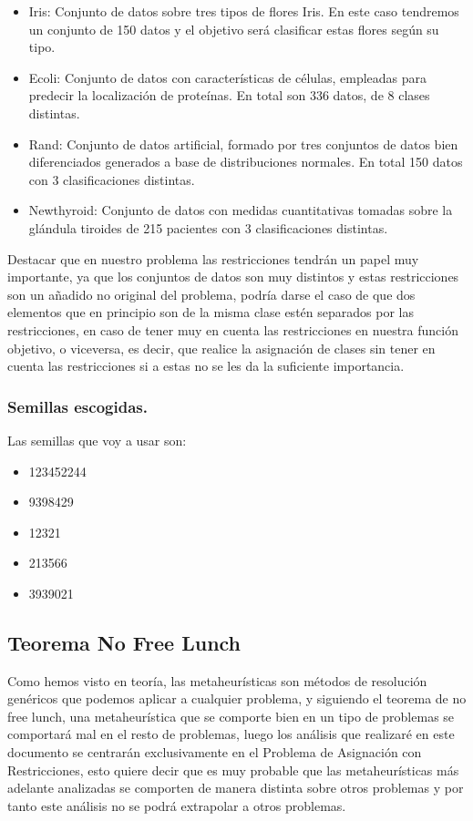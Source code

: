 \documentclass[12pt, spanish]{article}
\begin{document}
\begin{itemize}
	\item{Iris: Conjunto de datos sobre tres tipos de flores Iris. En este caso tendremos un conjunto de 150 datos y el objetivo será clasificar estas flores según su tipo.}
	\item{Ecoli: Conjunto de datos con características de células, empleadas para predecir la localización de proteínas. En total son 336 datos, de 8 clases distintas.}
	\item{Rand: Conjunto de datos artificial, formado por tres conjuntos de datos bien diferenciados generados a base de distribuciones normales. En total 150 datos con 3 clasificaciones distintas.}
	\item{Newthyroid: Conjunto de datos con medidas cuantitativas tomadas sobre la glándula tiroides de 215 pacientes con 3 clasificaciones distintas.} 
\end{itemize}

Destacar que en nuestro problema las restricciones tendrán un papel muy importante, ya que los conjuntos de datos son muy distintos y estas restricciones son un añadido no original del problema, podría darse el caso de que dos elementos que en principio son de la misma clase estén separados por las restricciones, en caso de tener muy en cuenta las restricciones en nuestra función objetivo, o viceversa, es decir, que realice la asignación de clases sin tener en cuenta las restricciones si a estas no se les da la suficiente importancia.


\subsubsection{Semillas escogidas.}

Las semillas que voy a usar son:

\begin{itemize}
	\item {123452244}
	\item {9398429}
	\item {12321}
	\item {213566}
	\item {3939021}
\end{itemize}

\subsection{Teorema No Free Lunch}

Como hemos visto en teoría, las metaheurísticas son métodos de resolución genéricos que podemos aplicar a cualquier problema, y siguiendo el teorema de no free lunch, una metaheurística que se comporte bien en un tipo de problemas se comportará mal en el resto de problemas, luego los análisis que realizaré en este documento se centrarán exclusivamente en el Problema de Asignación con Restricciones, esto quiere decir que es muy probable que las metaheurísticas más adelante analizadas se comporten de manera distinta sobre otros problemas y por tanto este análisis no se podrá extrapolar a otros problemas.
\end{document}
